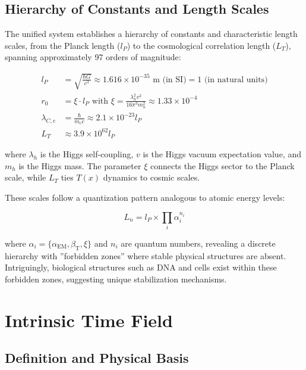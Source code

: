 \documentclass[aps,prl,twocolumn,superscriptaddress,nofootinbib]{revtex4-2}
\newcommand{\Tfield}{T(x)}
\newcommand{\alphaEM}{\alpha_{\text{EM}}}
\newcommand{\betaT}{\beta_{\text{T}}}
\begin{document}
	\subsection{Hierarchy of Constants and Length Scales}
	\label{subsec:hierarchy}
	
	The unified system establishes a hierarchy of constants and characteristic length scales, from the Planck length ($l_P$) to the cosmological correlation length ($L_T$), spanning approximately 97 orders of magnitude:
	
	\begin{equation}
		\begin{aligned}
			l_P &= \sqrt{\frac{\hbar G}{c^3}} \approx 1.616 \times 10^{-35} \text{ m (in SI)} = 1 \text{ (in natural units)} \\
			r_0 &= \xi \cdot l_P \text{ with } \xi = \frac{\lambda_h^2 v^2}{16\pi^3 m_h^2} \approx 1.33 \times 10^{-4} \\
			\lambda_{C,e} &= \frac{\hbar}{m_e c} \approx 2.1 \times 10^{-23} l_P \\
			L_T &\approx 3.9 \times 10^{62} l_P
		\end{aligned}
		\label{eq:length_scales}
	\end{equation}
	
	where $\lambda_h$ is the Higgs self-coupling, $v$ is the Higgs vacuum expectation value, and $m_h$ is the Higgs mass. The parameter $\xi$ connects the Higgs sector to the Planck scale, while $L_T$ ties $\Tfield$ dynamics to cosmic scales.
	
	These scales follow a quantization pattern analogous to atomic energy levels:
	
	\begin{equation}
		L_n = l_P \times \prod_i \alpha_i^{n_i}
		\label{eq:quantization}
	\end{equation}
	
	where $\alpha_i = \{\alphaEM, \betaT, \xi\}$ and $n_i$ are quantum numbers, revealing a discrete hierarchy with ''forbidden zones'' where stable physical structures are absent. Intriguingly, biological structures such as DNA and cells exist within these forbidden zones, suggesting unique stabilization mechanisms.
	
	\section{Intrinsic Time Field}
	\label{sec:time_field}
	
	\subsection{Definition and Physical Basis}
	\label{subsec:time_field_def}
	
\end{document}
